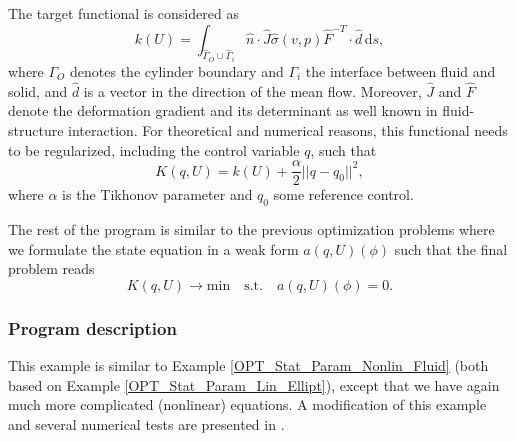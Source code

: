 The target functional is considered as 
\[
k(U) = \int_{\hat\Gamma_O \cup \hat\Gamma_i} \hat n\cdot \hat J\hat\sigma(v,p)\hat
F^{-T} \cdot \hat d \, \mathrm{d}s,
\]
where $\Gamma_O$ denotes the cylinder boundary and $\Gamma_i$ the 
interface between fluid and solid, and $\hat d$ is a vector in the
direction
of the mean flow. Moreover, $\hat J$ and $\hat F$ denote the deformation 
gradient and its determinant as well known in fluid-structure interaction.
For theoretical and numerical reasons, this functional 
needs to be regularized, including the control variable $q$, such that
\[
K(q,U) = k(U) + \frac{\alpha}{2}||q - q_0||^2,
\] 
where $\alpha$ is the Tikhonov parameter and $q_0$ some 
reference control. 

The rest of the program is similar to the previous optimization problems where
we formulate the state equation in a weak form $a(q,U)(\phi)$ such that the 
final problem reads
\[
K(q,U) \rightarrow \text{min} \quad \text{s.t.} \quad a(q,U)(\phi) = 0.
\]

\subsubsection{Program description}
This example is similar to Example \ref{OPT_Stat_Param_Nonlin_Fluid} (both 
based on Example \ref{OPT_Stat_Param_Lin_Ellipt}), except that we 
have again much more complicated (nonlinear) equations. A modification 
of this example and several numerical tests are presented 
in \cite{RiWi13_fsi_opt}.







